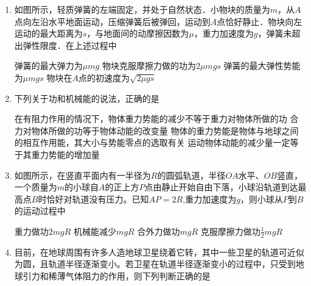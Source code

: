 
\begin{enumerate}[leftmargin=0em]
\renewcommand{\labelenumi}{\arabic{enumi}.}
\item
{}
如图所示，轻质弹簧的左端固定，并处于自然状态．小物块的质量为$ m $，从$ A $点向左沿水平地面运动，压缩弹簧后被弹回，运动到$ A $点恰好静止．物块向左运动的最大距离为$ s $，与地面间的动摩擦因数为$ \mu $，重力加速度为$ g $，弹簧未超出弹性限度．在上述过程中  
\begin{figure}[h!]
\centering

\end{figure}

\fourchoices
{弹簧的最大弹力为$ \mu mg $}
{物块克服摩擦力做的功为$ 2 \mu mgs $}
{弹簧的最大弹性势能为$ \mu mgs $}
{物块在$ A $点的初速度为$\sqrt{2 \mu gs}$}


\item
{}
下列关于功和机械能的说法，正确的是  

\fourchoices
{在有阻力作用的情况下，物体重力势能的减少不等于重力对物体所做的功}
{合力对物体所做的功等于物体动能的改变量}
{物体的重力势能是物体与地球之间的相互作用能，其大小与势能零点的选取有关}
{运动物体动能的减少量一定等于其重力势能的增加量}



\item
{}
如图所示，在竖直平面内有一半径为$ R $的圆弧轨道，半径$ OA $水平、$ OB $竖直，一个质量为$ m $的小球自$ A $的正上方$ P $点由静止开始自由下落，小球沿轨道到达最高点$ B $时恰好对轨道没有压力。已知$ AP=2R $,重力加速度为$ g $，则小球从$ P $到$ B $的运动过程中  
\begin{figure}[h!]
\centering

\end{figure}

\fourchoices
{重力做功$ 2mgR $ }
{机械能减少$ mgR $}
{合外力做功$ mgR $ }
{克服摩擦力做功$ \frac{ 1 }{ 2 } mgR $}


\item
{}
目前，在地球周围有许多人造地球卫星绕着它转，其中一些卫星的轨道可近似为圆，且轨道半径逐渐变小。若卫星在轨道半径逐渐变小的过程中，只受到地球引力和稀薄气体阻力的作用，则下列判断正确的是  


\end{enumerate}
